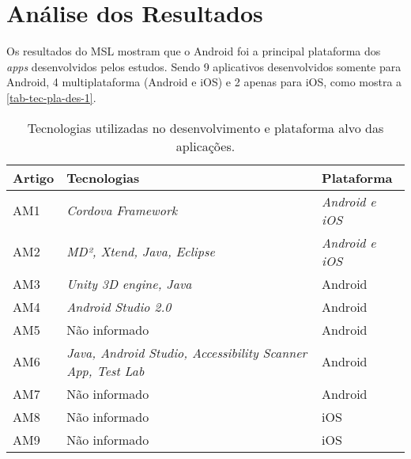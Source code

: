 \newpage

\section{Análise dos Resultados}

Os resultados do MSL mostram que o Android foi a principal plataforma dos \emph{apps} desenvolvidos pelos estudos.
Sendo 9 aplicativos desenvolvidos somente para Android, 4 multiplataforma (Android e iOS) e 2
apenas para iOS, como mostra a \autoref{tab-tec-pla-des-1}.

\begin{table}[htb]
    \begin{center}
        \caption{Tecnologias utilizadas no desenvolvimento e plataforma alvo das aplicações.}
        \label{tab-tec-pla-des-1}
        \begin{tabular}{p{1.0cm}|p{8.0cm}|p{3.0cm}}
            \textbf{Artigo} & \textbf{Tecnologias}                                             & \textbf{Plataforma}  \\
            \hline
            AM1             & \emph{Cordova Framework}                                         & \emph{Android e iOS} \\
            \hline
            AM2             & \emph{MD², Xtend, Java, Eclipse}                                 & \emph{Android e iOS} \\
            \hline
            AM3             & \emph{Unity 3D engine, Java}                                     & Android       \\
            \hline
            AM4             & \emph{Android Studio 2.0}                                        & Android       \\
            \hline
            AM5             & Não informado                                                    & Android       \\
            \hline
            AM6             & \emph{Java, Android Studio, Accessibility Scanner App, Test Lab} & Android       \\
            \hline
            AM7             & Não informado                                                    & Android       \\
            \hline
            AM8             & Não informado                                                    & iOS           \\
            \hline
            AM9             & Não informado                                                    & iOS           \\

\end{tabular}
\end{center}
\end{table}
